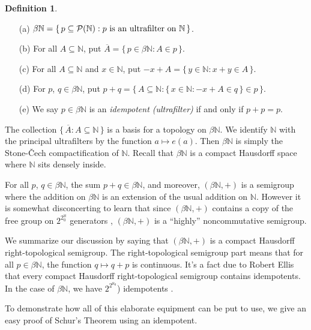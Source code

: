 \documentclass[12pt]{article}
\theoremstyle{plain}
\theoremstyle{definition}
\newtheorem{defn}[thm]{Definition}
\newcommand{\bbN}{\mathbb{N}}
\begin{document}
  \begin{defn}
    \label{defn:alg}
    \begin{itemize}
      \item[(a)] $\beta\bbN = \{\, p \subseteq \mathcal{P}(\bbN) :
        \hbox{$p$ is an ultrafilter on
        $\bbN$} \,\}$.
      \item[(b)] For all $A \subseteq \bbN$, put $\overline{A} = \{\,
        p \in \beta\bbN : A \in p \,\}$.
      \item[(c)] For all $A \subseteq \bbN$ and $x \in \bbN$, put
        $-x+A = \{\, y \in \bbN : x+y \in A \,\}$.
      \item[(d)] For $p$, $q \in \beta\bbN$, put
        $p+q = \bigl\{\, A \subseteq \bbN : \{\, x \in \bbN : -x +A \in q
        \,\} \in p \,\bigr\}$.
      \item[(e)] We say $p \in \beta\bbN$ is an \textsl{idempotent
          (ultrafilter)} if  and only if $p + p = p$.
    \end{itemize}
  \end{defn}

The collection $\{\, \overline{A} : A \subseteq \bbN \,\}$ is a
basis for a topology on $\beta\bbN$.
We identify $\bbN$ with the principal ultrafilters by the function
$a \mapsto e(a)$. Then $\beta\bbN$ is simply the Stone-\v{C}ech
compactification of $\bbN$. 
Recall that $\beta\bbN$ is a compact Hausdorff space where $\bbN$ sits
densely inside.  

For all $p$, $q \in \beta\bbN$, the sum $p+q \in \beta\bbN$, and moreover,
$(\beta\bbN, +)$ is a semigroup where the addition on $\beta\bbN$ is
an extension of the usual addition on $\bbN$. 
However it is somewhat disconcerting to learn that since $(\beta\bbN,
+)$ contains a copy of the free group on $2^{2^\aleph_0}$ generators
\cite[Corollary 7.36]{Hindman:1998fk}, $(\beta\bbN,+)$ is a ``highly''
noncommutative semigroup.


We summarize our discussion by saying that $(\beta\bbN,
+)$ is a compact Hausdorff right-topological semigroup. 
The right-topological semigroup part means that for all $p \in
\beta\bbN$, the function $q \mapsto q+p$ is continuous.
It's a fact due to Robert Ellis \cite[Corollary 2.10]{Ellis:1969zr}
that every compact Hausdorff right-topological semigroup contains
idempotents. 
In the case of $\beta\bbN$, we have 
$2^{2^{\aleph_0}}$) idempotents \cite[Theorem
6.44]{Hindman:1998fk}. 

To demonstrate how all of this elaborate equipment can be put to use,
we give an easy proof of Schur's Theorem using an idempotent.
\end{document}
